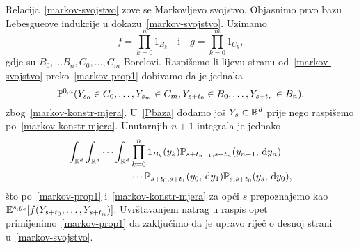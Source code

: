 \documentclass[main.tex]{subfiles}
\begin{document}
\begin{komentar} \label{markov-prop-kom}
	Relacija~\eqref{markov-svojstvo} zove se Markovljevo svojstvo. Objasnimo prvo bazu Lebesgueove
	indukcije u dokazu~\eqref{markov-svojstvo}. Uzimamo
	\[
		f = \prod_{k=0}^n 1_{B_k} \quad \mathrm i \quad g = \prod_{k=0}^m 1_{C_k},
	\]
	gdje su \( B_0, \ldots B_n, C_0, \ldots, C_m \) Borelovi. Raspišemo li lijevu stranu od~\eqref{markov-svojstvo} preko~\eqref{markov-prop1}
	dobivamo da je jednaka
	\begin{equation} \label{Pbaza}
		\P^{0,a}(Y_{s_0} \in C_0, \ldots, Y_{s_m} \in C_m, Y_{s+t_0} \in B_0, \ldots, Y_{s+t_n} \in B_n).
	\end{equation}
	zbog~\eqref{markov-konstr-mjera}. U~\eqref{Pbaza} dodamo još \( Y_s \in \R^d \) prije nego raspišemo po~\eqref{markov-konstr-mjera}. Unutarnjih \( n + 1 \) integrala je jednako
	\begin{equation}
		\begin{aligned}
			\int_{\R^d} \int_{\R^d} \cdots \int_{\R^d} & \prod_{k=0}^n 1_{B_k}(y_k) \Ptrans_{s+t_{n-1}, s+t_n} (y_{n-1}, \D y_n)      \\
			                                           & \cdots \Ptrans_{s+t_0, s+t_1}(y_0, \D y_1) \Ptrans_{s, s+t_0} (y_s, \D y_0),
		\end{aligned}
	\end{equation}
	što po~\eqref{markov-prop1} i~\eqref{markov-konstr-mjera} za opći \( s \) prepoznajemo kao \( \E^{s, y_s}[f(Y_{s+t_0},\ldots,Y_{s+t_n})] \).
	Uvrštavanjem natrag u raspis opet primijenimo~\eqref{markov-prop1} da zaključimo da je upravo riječ o desnoj strani u~\eqref{markov-svojstvo}.


\end{komentar}
\end{document}

